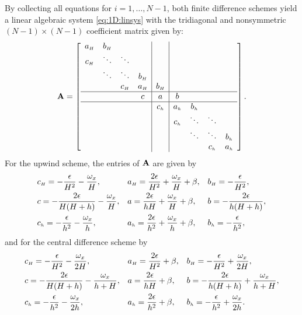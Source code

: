 By collecting all equations for $i=1,\ldots,N-1$, both finite difference
schemes yield a linear algebraic system \eqref{eq:1D:linsys} with the
tridiagonal and nonsymmetric $(N-1)\times (N-1)$ coefficient matrix given by:
%
\begin{equation}
\label{eq:back:1Dmatrix}
\A=\left[
  \begin{array}{cccc|c|cccc}
     \entryvC &\entryvE    &  &  &  &  &  &  &  \\
     \entryvW &\ddots &\ddots  &  &  &  &  &  &  \\
     &  \ddots& \ddots &  \entryvE   &  &  &  &  &  \\
     &  &\entryvW & \entryvC  & \entryvE   &  &  &  &  \\ \hline
     &  &  & \entryzW  & \entryzC  & \entryzE  &  &  &  \\ \hline
     &  &  &  & \entrywW  & \entrywC  & \entrywE  &  &  \\
     &  &  &  &  & \entrywW  & \ddots & \ddots &  \\
     &  &  &  &  &  & \ddots & \ddots & \entrywE  \\
     &  &  &  &  &  &  & \entrywW  & \entrywC  \\
  \end{array}
\right].%
\end{equation}
%
For the upwind scheme, the entries of $\mathbf{A}$ are given by
%
\begin{align}
    &c_{\scriptscriptstyle H}  =  -\frac{\epsilon}{H^{2}} - \frac{\omega_x}{H},&
    &a_{\scriptscriptstyle H}  =  \frac{2\epsilon}{H^{2}} + \frac{\omega_x}{H}+\beta, &
    &b_{\scriptscriptstyle H}   =  -\frac{\epsilon}{H^{2}}, \nonumber \\
    &c  =  -\frac{2\epsilon}{H(H+h)} - \frac{\omega_x}{H},&
    &a  =  \frac{2\epsilon}{hH} + \frac{\omega_x}{H}+\beta,&
    &b  =  -\frac{2\epsilon}{h(H+h)}, \label{eq:back:upwind} \\
    &c_{\scriptscriptstyle h}  =  -\frac{\epsilon}{h^{2}} - \frac{\omega_x}{h},&
    &a_{\scriptscriptstyle h}  =  \frac{2\epsilon}{h^{2}} + \frac{\omega_x}{h}+\beta,&
    &b_{\scriptscriptstyle h}  =  -\frac{\epsilon}{h^{2}}, \nonumber
\end{align}
%
and for the central difference scheme by
%
\begin{align}
    &c_{\scriptscriptstyle H}  =  -\frac{\epsilon}{H^{2}} - \frac{\omega_x}{2H},&
    &a_{\scriptscriptstyle H}  =  \frac{2\epsilon}{H^{2}} + \beta, &
    &b_{\scriptscriptstyle H}  =  -\frac{\epsilon}{H^{2}}+\frac{\omega_x}{2H}, \nonumber \\
    &c  =  -\frac{2\epsilon}{H(H+h)} -\frac{\omega_x}{h+H},&
    &a  =  \frac{2\epsilon}{hH} + \beta,&
    &b  =  -\frac{2\epsilon}{h(H+h)}+\frac{\omega_x}{h+H}, \label{eq:back:central} \\
    &c_{\scriptscriptstyle h}  =  -\frac{\epsilon}{h^{2}} - \frac{\omega_x}{2h},&
    &a_{\scriptscriptstyle h}  =  \frac{2\epsilon}{h^{2}} +\beta,&
    &b_{\scriptscriptstyle h}  =  -\frac{\epsilon}{h^{2}}+ \frac{\omega_x}{2h}. \nonumber
\end{align}

